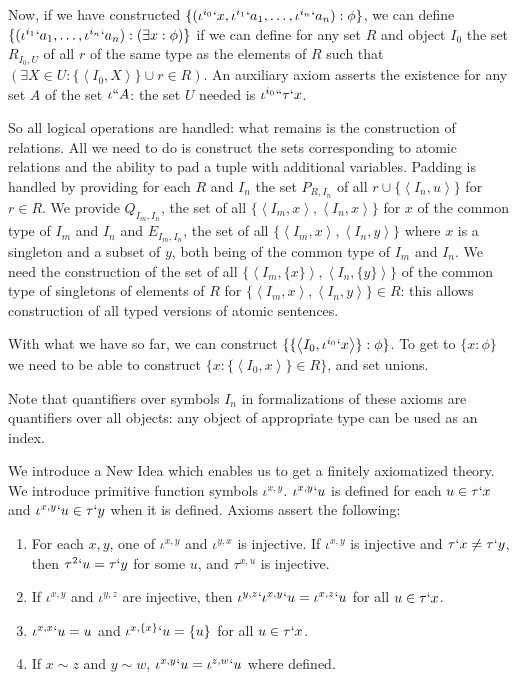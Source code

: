 \documentclass[12pt]{article}
\begin{document}
\begin{description}
Now, if we have constructed $\{(\iota^{i_0}`x,\iota^{i_1}`a_1,\ldots,\iota^{i_n}`a_n):\phi\}$, we can define $\{(\iota^{i_1}`a_1,\ldots,\iota^{i_n}`a_n):(\exists x:\phi)\}$
if we can define for any set $R$ and object $I_0$ the set $R_{I_0,U}$ of all $r$ of the same type as the elements of $R$ such that $(\exists X \in U: \{\left<I_0,X\right>\} \cup r \in R)$.
An auxiliary axiom asserts the existence for any set $A$ of the set $\iota``A$:  the set $U$ needed is $\iota^{i_0}``\tau`x$.

So all logical operations are handled:  what remains is the construction of relations.  All we need to do is construct the sets corresponding to atomic relations and the ability
to pad a tuple with additional variables.  Padding is handled by providing for each $R$ and $I_n$ the set $P_{R,I_n}$ of all $r \cup \{\left<I_n,u\right>\}$ for $r \in R$.
We provide $Q_{I_m,I_n}$, the set of all $\{\left<I_m,x\right>,\left<I_n,x\right>\}$ for $x$ of the common type of $I_m$ and $I_n$ and $E_{I_m,I_n}$, the set of all
$\{\left<I_m,x\right>,\left<I_n,y\right>\}$  where $x$ is a singleton and a subset of $y$, both being of the common type of $I_m$ and $I_n$.  We need the construction 
of the set of all $\{\left<I_m,\{x\}\right>,\left<I_n,\{y\}\right>\}$ of the common type of singletons of elements of $R$ for $\{\left<I_m,x\right>,\left<I_n,y\right>\}\in R$:  this allows construction of all typed versions of
atomic sentences.

With what we have so far, we can construct  $\{\{\left<I_0,\iota^{i_0}`x\right>\}:\phi\}$.  To get to $\{x:\phi\}$ we need to be able to construct $\{x : \{\left<I_0,x\right>\} \in R\}$,
and set unions.

Note that quantifiers over symbols $I_n$ in formalizations of these axioms are quantifiers over all objects:  any object of appropriate type can be used as an index.

\end{description}

We introduce a New Idea which enables us to get a finitely axiomatized theory.  We introduce primitive function symbols $\iota^{x,y}$.  $\iota^{x,y}`u$ is defined for each $u \in \tau`x$
and $\iota^{x,y}`u \in \tau`y$ when it is defined.   Axioms assert the following:

\begin{enumerate}

\item For each $x,y$, one of $\iota^{x,y}$ and $\iota^{y,x}$ is injective.  If $\iota^{x,y}$ is injective and $\tau`x \neq \tau`y$, then $\tau^2`u = \tau`y$ for some $u$,
and $\tau^{x,u}$ is injective.

\item If $\iota^{x,y}$ and $\iota^{y,z}$ are injective, then $\iota^{y,z}`\iota^{x,y}`u = \iota^{x,z}`u$ for all $u \in \tau`x$.

\item $\iota^{x,x}`u = u$ and $\iota^{x,\{x\}}`u = \{u\}$ for all $u \in \tau`x$.

\item  If $x \sim z$ and $y \sim w$, $\iota^{x,y}`u = \iota^{z,w}`u$ where defined.

\end{enumerate}
\end{document}
